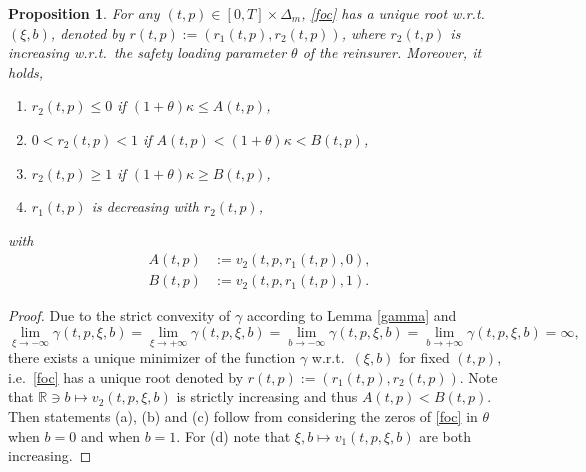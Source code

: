 \documentclass[reqno, 11pt]{amsart}%
\newcommand{\R}{\mathbb{R}}
\newtheorem{proposition}[theorem]{Proposition}
\theoremstyle{definition}
\numberwithin{equation}{section} \numberwithin{theorem}{section}
\begin{document}
\begin{proposition}\label{candidates}
	For any $(t,p)\in[0,T]\times\Delta_m$, \eqref{foc} has a unique root w.r.t.\ $(\xi,b)$, denoted by $r(t,p):=(r_1(t,p),r_2(t,p))$, where $r_2(t,p)$ is increasing w.r.t.\ the safety loading parameter $\theta$ of the reinsurer. Moreover,
	it holds, 
	\begin{enumerate}
		\item $r_2(t,p) \le 0$ if $(1+\theta)\kappa \le A(t,p)$,
		\item $0< r_2(t,p) <1$ if $A(t,p) < (1+\theta)\kappa < B(t,p)$,
		\item $r_2(t,p)\ge 1$ if $(1+\theta)\kappa \ge B(t,p)$,
		\item $r_1(t,p)$ is decreasing with $r_2(t,p)$,
	\end{enumerate}
with
\begin{align*}
A(t,p) &:= v_2(t,p,r_1(t,p),0), \\
B(t,p) &:= v_2(t,p,r_1(t,p),1).
\end{align*}
\end{proposition}

\begin{proof}
   Due to the strict convexity of $\gamma$ according to Lemma \ref{gamma} and
   \begin{equation*}
   \lim_{\xi\to-\infty}\gamma(t,p,\xi,b) = \lim_{\xi\to+\infty}\gamma(t,p,\xi,b) = \lim_{b\to-\infty}\gamma(t,p,\xi,b) = \lim_{b\to+\infty}\gamma(t,p,\xi,b) = \infty,
   \end{equation*}
   there exists a unique minimizer of the function $\gamma$ w.r.t.\ $(\xi,b)$ for fixed $(t,p)$, i.e.\ \eqref{foc} has a unique root denoted by $r(t,p):=(r_1(t,p),r_2(t,p))$.
   Note that $\R\ni b\mapsto v_2(t,p,\xi,b)$ is strictly increasing and thus $A(t,p)<B(t,p)$. Then statements (a), (b) and (c) follow from considering the zeros of \eqref{foc} in $\theta$ when $b=0$ and when $b=1$. For (d) note that $\xi, b\mapsto v_1(t,p,\xi,b)$ are both increasing.
\end{proof}	
\end{document}
